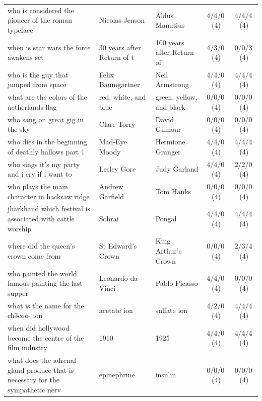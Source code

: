\begin{longtable}{@{}p{6.6cm}p{2.9cm}p{2.9cm}cc@{}}
\rowcolor{neutralgray}
who is considered the pioneer of the roman typeface & Nicolas Jenson & Aldus Manutius & 4/4/0\,\footnotesize(4) & 4/4/4\,\footnotesize(4) \\
when is star wars the force awakens set & 30 years after Return of t & 100 years after Return of  & 4/3/0\,\footnotesize(4) & 0/0/3\,\footnotesize(4) \\
\rowcolor{neutralgray}
who is the guy that jumped from space & Felix Baumgartner & Neil Armstrong & 4/4/0\,\footnotesize(4) & 4/4/4\,\footnotesize(4) \\
what are the colors of the netherlands flag & red, white, and blue & green, yellow, and black & 0/0/0\,\footnotesize(4) & 0/0/0\,\footnotesize(4) \\
\rowcolor{neutralgray}
who sang on great gig in the sky & Clare Torry & David Gilmour & 0/0/0\,\footnotesize(4) & 0/0/0\,\footnotesize(4) \\
who dies in the beginning of deathly hallows part 1 & Mad-Eye Moody & Hermione Granger & 4/4/0\,\footnotesize(4) & 4/4/4\,\footnotesize(4) \\
\rowcolor{neutralgray}
who sings it's my party and i cry if i want to & Lesley Gore & Judy Garland & 4/4/0\,\footnotesize(4) & 2/2/0\,\footnotesize(4) \\
who plays the main character in hacksaw ridge & Andrew Garfield & Tom Hanks & 0/0/0\,\footnotesize(4) & 0/0/0\,\footnotesize(4) \\
\rowcolor{neutralgray}
jharkhand which festival is associated with cattle worship & Sohrai & Pongal & 4/4/0\,\footnotesize(4) & 4/4/4\,\footnotesize(4) \\
where did the queen's crown come from & St Edward's Crown & King Arthur's Crown & 0/0/0\,\footnotesize(4) & 2/3/4\,\footnotesize(4) \\
\rowcolor{neutralgray}
who painted the world famous painting the last supper & Leonardo da Vinci & Pablo Picasso & 4/4/0\,\footnotesize(4) & 0/0/0\,\footnotesize(4) \\
what is the name for the ch3coo- ion & acetate ion & sulfate ion & 4/2/0\,\footnotesize(4) & 4/4/4\,\footnotesize(4) \\
\rowcolor{neutralgray}
when did hollywood become the centre of the film industry & 1910 & 1925 & 4/4/0\,\footnotesize(4) & 4/4/4\,\footnotesize(4) \\
what does the adrenal gland produce that is necessary for the sympathetic nerv & epinephrine & insulin & 0/0/0\,\footnotesize(4) & 0/0/0\,\footnotesize(4) \\

\end{longtable}
